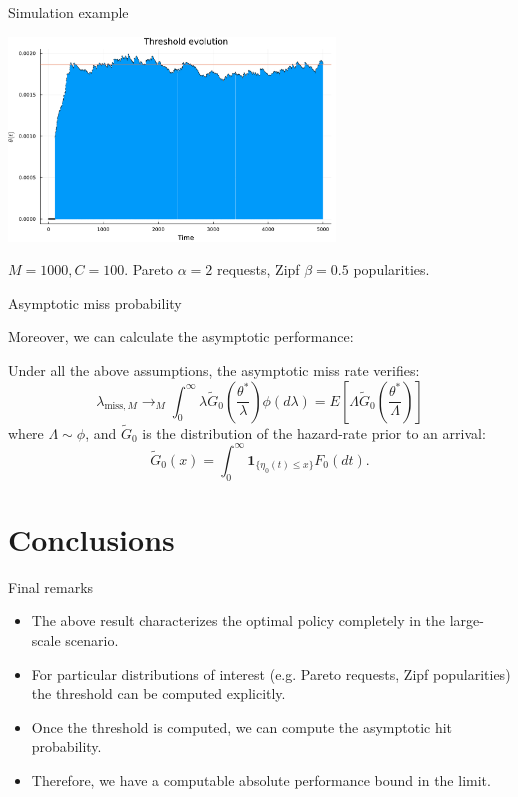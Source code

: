 \documentclass[aspectratio=169]{beamer}
\newcommand{\E}[1]{E\left[#1 \right]}
\newcommand{\ind}[1]{\mathbf{1}_{#1}}
\newenvironment*{myitem}[1][1.5em]{\begin{itemize}\setlength{\itemsep}{#1}}{\end{itemize}}
\begin{document}
\begin{frame}{Simulation example}
	\begin{center}
		\includegraphics[width=0.65\textwidth]{figuras/simulation_example.pdf}

		{\footnotesize $M=1000, C=100$. Pareto $\alpha=2$ requests, Zipf $\beta=0.5$  popularities.}
	\end{center}
\end{frame}

\begin{frame}{Asymptotic miss probability}
	
	Moreover, we can calculate the asymptotic performance:

	\begin{theorem}
		Under all the above assumptions, the asymptotic \alert{miss rate} verifies:
		\begin{equation*}
			\lambda_{\text{miss},M} \to_M \int_0^\infty \lambda \tilde{G}_0\left(\frac{\theta^*}{\lambda}\right) \phi(d\lambda) = \E{\Lambda \tilde{G}_0\left(\frac{\theta^*}{\Lambda}\right)} 
		\end{equation*}
		where $\Lambda \sim \phi$, and $\tilde{G}_0$ is the distribution of the hazard-rate prior to an arrival:
		\begin{equation*}
			\tilde{G}_0(x) = \int_0^\infty \ind{\{\eta_0(t)\leqslant x\}} F_0(dt).
		\end{equation*}
	\end{theorem}
\end{frame}

\section{Conclusions}

\begin{frame}{Final remarks}
	
	\begin{myitem}[2em]
		\item The above result characterizes the optimal policy completely in the large-scale scenario.
		
		\item For particular distributions of interest (e.g. Pareto requests, Zipf popularities) the threshold can be computed explicitly.
		
		\item Once the threshold is computed, we can compute the asymptotic hit probability.
		
		\item Therefore, we have a computable absolute performance bound in the limit.
	\end{myitem}
\end{frame}
\end{document}
